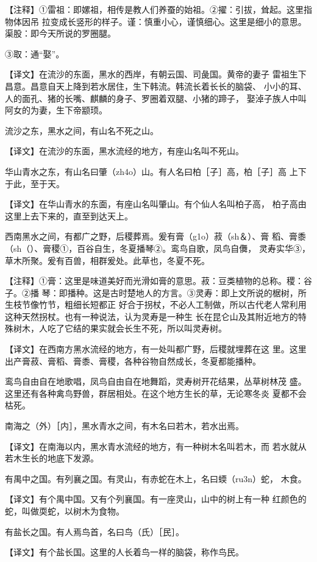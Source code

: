 \documentclass[a4paper,12pt,UTF8,twoside]{ctexbook}
\begin{document}
【注释】①雷祖：即嫘祖，相传是教人们养蚕的始祖。②擢：引拔，耸起。这里指物体因吊 拉变成长竖形的样子。谨：慎重小心，谨慎细心。这里是细小的意思。渠股：即今天所说的罗圈腿。

③取：通“娶”。

【译文】在流沙的东面，黑水的西岸，有朝云国、司彘国。黄帝的妻子 雷祖生下昌意。昌意自天上降到若水居住，生下韩流。韩流长着长长的脑袋、 小小的耳、人的面孔、猪的长嘴、麒麟的身子、罗圈着双腿、小猪的蹄子， 娶淖子族人中叫阿女的为妻，生下帝颛顼。

流沙之东，黑水之间，有山名不死之山。

【译文】在流沙的东面，黑水流经的地方，有座山名叫不死山。

华山青水之东，有山名曰肇（zh4o）山。有人名曰柏［子］高，柏［子］高 上下于此，至于天。

【译文】在华山青水的东面，有座山名叫肇山。有个仙人名叫柏子高， 柏子高由这里上去下来的，直至到达天上。

西南黑水之间，有都广之野，后稷葬焉。爰有膏（g1o）菽（sh＆）、膏 稻、膏黍（sh（）、膏稷①，百谷自生，冬夏播琴②。鸾鸟自歌，凤鸟自儛， 灵寿实华③，草木所聚。爰有百兽，相群爰处。此草也，冬夏不死。

【注释】①膏：这里是味道美好而光滑如膏的意思。菽：豆类植物的总称。稷：谷子。②播 琴：即播种。这是古时楚地人的方言。③灵寿：即上文所说的椐树，所生枝节像竹节，粗细长短都正 好合于拐杖，不必人工制做，所以古代老人常利用这种天然拐杖。也有一种说法，认为灵寿是一种生 长在昆仑山及其附近地方的特殊树木，人吃了它结的果实就会长生不死，所以叫灵寿树。

【译文】在西南方黑水流经的地方，有一处叫都广野，后稷就埋葬在这 里。这里出产膏菽、膏稻、膏黍、膏稷，各种谷物自然成长，冬夏都能播种。

鸾鸟自由自在地歌唱，凤鸟自由自在地舞蹈，灵寿树开花结果，丛草树林茂 盛。这里还有各种禽鸟野兽，群居相处。在这个地方生长的草，无论寒冬炎 夏都不会枯死。

南海之（外）［内］，黑水青水之间，有木名曰若木，若水出焉。

【译文】在南海以内，黑水青水流经的地方，有一种树木名叫若木，而 若水就从若木生长的地底下发源。

有禺中之国。有列襄之国。有灵山，有赤蛇在木上，名曰蝡（ru3n）蛇， 木食。

【译文】有个禺中国。又有个列襄国。有一座灵山，山中的树上有一种 红颜色的蛇，叫做耎蛇，以树木为食物。

有盐长之国。有人焉鸟首，名曰鸟（氏）［民］。

【译文】有个盐长国。这里的人长着鸟一样的脑袋，称作鸟民。
\end{document}
